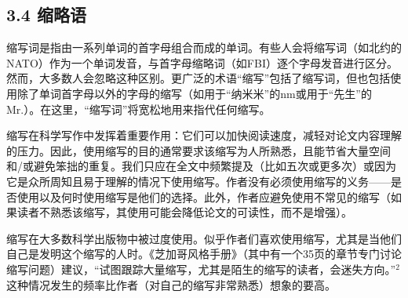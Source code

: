 \subsection*{3.4 缩略语}
缩写词是指由一系列单词的首字母组合而成的单词。有些人会将缩写词（如北约的NATO）作为一个单词发音，与首字母缩略词（如FBI）逐个字母发音进行区分。然而，大多数人会忽略这种区别。更广泛的术语“缩写”包括了缩写词，但也包括使用除了单词首字母以外的字母的缩写（如用于“纳米米”的nm或用于“先生”的Mr.）。在这里，“缩写词”将宽松地用来指代任何缩写。

缩写在科学写作中发挥着重要作用：它们可以加快阅读速度，减轻对论文内容理解的压力。因此，使用缩写的目的通常要求该缩写为人所熟悉，且能节省大量空间和/或避免笨拙的重复。我们只应在全文中频繁提及（比如五次或更多次）或因为它是众所周知且易于理解的情况下使用缩写。作者没有必须使用缩写的义务——是否使用以及何时使用缩写是他们的选择。此外，作者应避免使用不常见的缩写（如果读者不熟悉该缩写，其使用可能会降低论文的可读性，而不是增强）。

缩写在大多数科学出版物中被过度使用。似乎作者们喜欢使用缩写，尤其是当他们自己是发明这个缩写的人时。《芝加哥风格手册》（其中有一个35页的章节专门讨论缩写问题）建议，“试图跟踪大量缩写，尤其是陌生的缩写的读者，会迷失方向。”${ }^{2}$这种情况发生的频率比作者（对自己的缩写非常熟悉）想象的要高。

